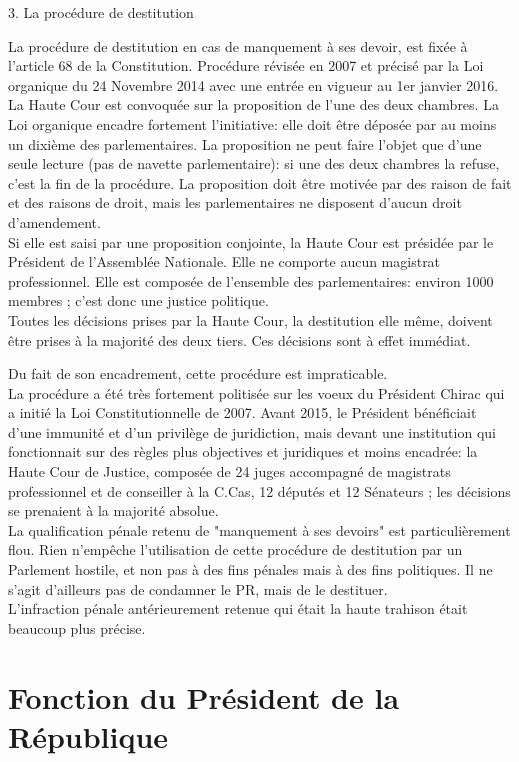 \documentclass[12pt, a4paper, openany]{book}
\begin{document}
3. La procédure de destitution


La procédure de destitution en cas de manquement à ses devoir, est fixée à l'article 68 de la Constitution. Procédure révisée en 2007 et précisé par la Loi organique du 24 Novembre 2014 avec une entrée en vigueur au 1er janvier 2016. \\
La Haute Cour est convoquée sur la proposition de l'une des deux chambres. La Loi organique encadre fortement l'initiative: elle doit être déposée par au moins un dixième des parlementaires. La proposition ne peut faire l'objet que d'une seule lecture (pas de navette parlementaire): si une des deux chambres la refuse, c'est la fin de la procédure. La proposition doit être motivée par des raison de fait et des raisons de droit, mais les parlementaires ne disposent d'aucun droit d'amendement. \\
Si elle est saisi par une proposition conjointe, la Haute Cour est présidée par le Président de l'Assemblée Nationale. Elle ne comporte aucun magistrat professionnel. Elle est composée de l'ensemble des parlementaires: environ 1000 membres ; c'est donc une justice politique. \\
Toutes les décisions prises par la Haute Cour, la destitution elle même, doivent être prises à la majorité des deux tiers. Ces décisions sont à effet immédiat.  


Du fait de son encadrement, cette procédure est impraticable. \\
La procédure a été très fortement politisée sur les voeux du Président Chirac qui a initié la Loi Constitutionnelle de 2007. Avant 2015, le Président bénéficiait d'une immunité et d'un privilège de juridiction, mais devant une institution qui fonctionnait sur des règles plus objectives et juridiques et moins encadrée: la Haute Cour de Justice, composée de 24 juges accompagné de magistrats professionnel et de conseiller à la C.Cas, 12 députés et 12 Sénateurs ; les décisions se prenaient à la majorité absolue. \\
La qualification pénale retenu de "manquement à ses devoirs" est particulièrement flou. Rien n'empêche l'utilisation de cette procédure de destitution par un Parlement hostile, et non pas à des fins pénales mais à des fins politiques. Il ne s'agit d'ailleurs pas de condamner le PR, mais de le destituer. \\
L'infraction pénale antérieurement retenue qui était la haute trahison était beaucoup plus précise. 


\section{Fonction du Président de la République}
\end{document}
